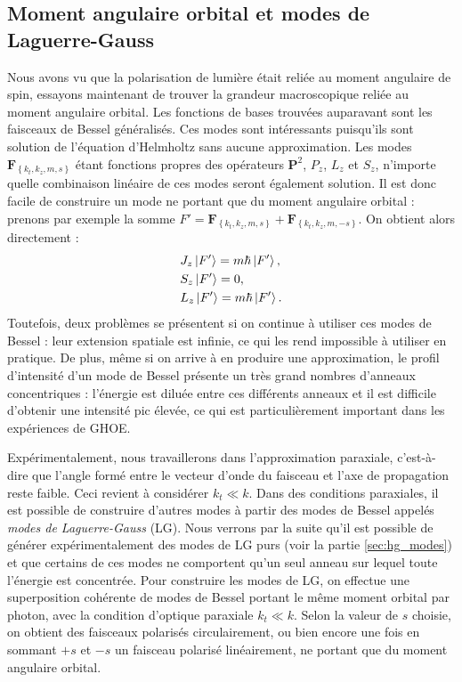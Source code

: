 \subsection{Moment angulaire orbital et modes de Laguerre-Gauss}
\label{sec:oamLG}
Nous avons vu que la polarisation de lumière était reliée au moment angulaire de spin, essayons maintenant de trouver la grandeur macroscopique reliée au moment angulaire orbital. 
Les fonctions de bases trouvées auparavant sont les faisceaux de Bessel généralisés. Ces modes sont intéressants puisqu'ils sont solution de l'équation d'Helmholtz sans aucune approximation. Les modes $\bm{F}_{\left\{k_t,k_z,m,s\right\}}$ étant fonctions propres des opérateurs $\bm{P}^2$, $P_z$, $L_z$ et $S_z$, n'importe quelle combinaison linéaire de ces modes seront également solution. Il est donc facile de construire un mode ne portant que du moment angulaire orbital : prenons par exemple la somme $F'=\bm{F}_{\left\{k_t,k_z,m,s\right\}}+\bm{F}_{\left\{k_t,k_z,m,-s\right\}}$. On obtient alors directement :
\begin{align*}
&J_z\ket{F'} = m\hbar\ket{F'},\\
&S_z\ket{F'} = 0,\\
&L_z\ket{F'} = m\hbar\ket{F'}.
\end{align*}
Toutefois, deux problèmes se présentent si on continue à utiliser ces modes de Bessel : leur extension spatiale est infinie, ce qui les rend impossible à utiliser en pratique. De plus, même si on arrive à en produire une approximation, le profil d'intensité d'un mode de Bessel présente un très grand nombres d'anneaux concentriques : l'énergie est diluée entre ces différents anneaux et il est difficile d'obtenir une intensité pic élevée, ce qui est particulièrement important dans les expériences de GHOE.\par Expérimentalement, nous travaillerons dans l'approximation paraxiale, c'est-à-dire que l'angle formé entre le vecteur d'onde du faisceau et l'axe de propagation reste faible. Ceci revient à considérer $k_t \ll k$. Dans des conditions paraxiales, il est possible de construire d'autres modes à partir des modes de Bessel appelés \textit{modes de Laguerre-Gauss} (LG). Nous verrons par la suite qu'il est possible de générer expérimentalement des modes de LG purs (voir la partie \ref{sec:hg_modes}) et que certains de ces modes ne comportent qu'un seul anneau sur lequel toute l'énergie est concentrée.
Pour construire les modes de LG, on effectue une superposition cohérente de modes de Bessel portant le même moment orbital par photon, avec la condition d'optique paraxiale $k_t \ll k$. Selon la valeur de $s$ choisie, on obtient des faisceaux polarisés circulairement, ou bien encore une fois en sommant $+s$ et $-s$ un faisceau polarisé linéairement, ne portant que du moment angulaire orbital.

